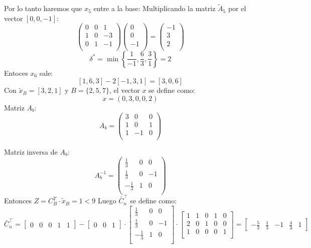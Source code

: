 \documentclass{article}
\begin{document}
\begin{flushleft}
		Por lo tanto haremos que $x_5$ entre a la base:
		Multiplicando la matriz \(\tilde{A}_5\) por el vector \([0, 0, -1]\):
		\[
		\begin{pmatrix}
		0 & 0 & 1 \\
		1 & 0 & -3 \\
		0 & 1 & -1 \\
		\end{pmatrix}
		\begin{pmatrix}
		0 \\
		0 \\
		-1 \\
		\end{pmatrix}
		=
		\begin{pmatrix}
		-1 \\
		3 \\
		2 \\
		\end{pmatrix}
		\]
		\[
			\delta^* = \min \left\{ \frac{1}{-1}, \frac{6}{3}, \frac{3}{1} \right\} = 2
		\]
		Entoces \(x_6\) sale:
		\[
		[1, 6, 3] - 2[-1, 3, 1] = [3, 0, 6]
		\]
		Con \(\tilde{x}_B = [3, 2, 1]\) y \(B = \{2, 5, 7\}\), el vector \(x\) se define como:
		\[
		x = (0, 3, 0, 0, 2)
		\]
		Matriz \( A_b \):
		\[
		A_b = \begin{pmatrix}
		3 & 0 & 0 \\
		1 & 0 & 1 \\
		1 & -1 & 0 \\
		\end{pmatrix}
		\]

		Matriz inversa de \( A_b \):
		\[
		A_b^{-1} = \begin{pmatrix}
		\frac{1}{3} & 0 & 0 \\
		\frac{1}{3} & 0 & -1 \\
		-\frac{1}{3} & 1 & 0 \\
		\end{pmatrix}
		\]
		Entonces \( Z = C_B^T \cdot \tilde{x}_B = 1 < 9 \)
		\newpage
		Luego \(\bar{C}_n^\intercal\) se define como:
		\begin{equation*}
			\bar{C}_n^\intercal = 
			\begin{bmatrix}
				0 & 0 & 0 & 1 & 1
			\end{bmatrix} - 
			\begin{bmatrix}
				0 & 0 & 1
			\end{bmatrix} \cdot
			\begin{bmatrix}
				\frac{1}{3} & 0 & 0 \\
				\frac{1}{3} & 0 & -1 \\
				-\frac{1}{3} & 1 & 0 \\
			\end{bmatrix} \cdot
			\begin{bmatrix}
				1 & 1 & 0 & 1 & 0  \\
				2 & 0 & 1 &  0 & 0  \\
				1 & 0 & 0 & 0 & 1  \\
			\end{bmatrix} = 
			\begin{bmatrix}
				-\frac{5}{3} & \frac{1}{3} & -1 & \frac{4}{3} & 1
			\end{bmatrix}
		\end{equation*}


\end{flushleft}
\end{document}
